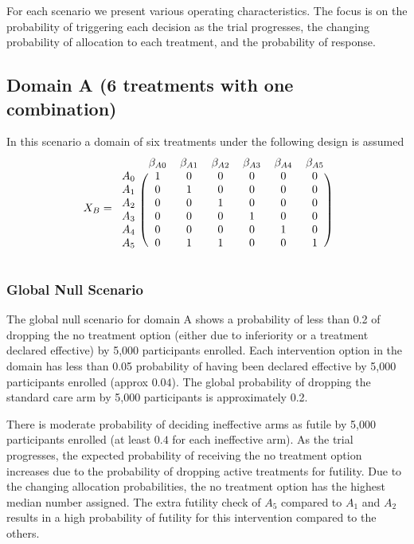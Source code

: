 \documentclass[
]{article}
\begin{document}
For each scenario we present various operating characteristics.
The focus is on the probability of triggering each decision as the trial progresses, the changing probability of allocation to each treatment, and the probability of response.

\hypertarget{domain-a-6-treatments-with-one-combination}{%
\subsection{Domain A (6 treatments with one combination)}\label{domain-a-6-treatments-with-one-combination}}

In this scenario a domain of six treatments under the following design is assumed
\[
 X_{B} = 
\begin{blockarray}{ccccccc}
          & \beta_{A0} & \beta_{A1} & \beta_{A2} & \beta_{A3} & \beta_{A4} & \beta_{A5} \\
\begin{block}{r(cccccc)}
      A_0 & 1 & 0 & 0 & 0 & 0 & 0 \\
      A_1 & 0 & 1 & 0 & 0 & 0 & 0 \\
      A_2 & 0 & 0 & 1 & 0 & 0 & 0 \\
      A_3 & 0 & 0 & 0 & 1 & 0 & 0 \\
      A_4 & 0 & 0 & 0 & 0 & 1 & 0 \\
      A_5 & 0 & 1 & 1 & 0 & 0 & 1 \\
\end{block}
\end{blockarray}
\]

\hypertarget{global-null-scenario}{%
\subsubsection{Global Null Scenario}\label{global-null-scenario}}

The global null scenario for domain A shows a probability of less than 0.2 of dropping the no treatment option (either due to inferiority or a treatment declared effective) by 5,000 participants enrolled.
Each intervention option in the domain has less than 0.05 probability of having been declared effective by 5,000 participants enrolled (approx \(0.04\)).
The global probability of dropping the standard care arm by 5,000 participants is approximately 0.2.

There is moderate probability of deciding ineffective arms as futile by 5,000 participants enrolled (at least \(0.4\) for each ineffective arm).
As the trial progresses, the expected probability of receiving the no treatment option increases due to the probability of dropping active treatments for futility.
Due to the changing allocation probabilities, the no treatment option has the highest median number assigned.
The extra futility check of \(A_5\) compared to \(A_1\) and \(A_2\) results in a high probability of futility for this intervention compared to the others.
\end{document}

